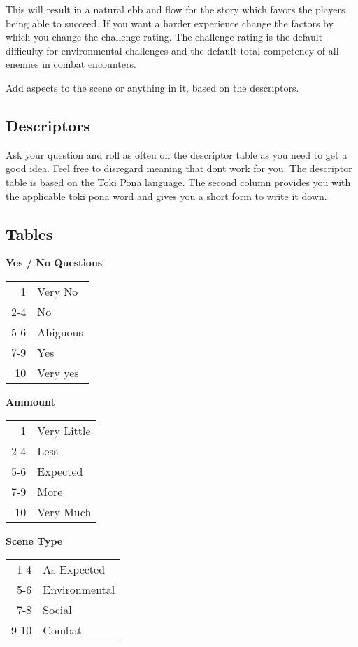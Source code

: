 \documentclass[11pt]{article}
\begin{document}
{This will result in a natural ebb and flow for the story which favors the players being able to succeed. If you want a harder experience change the factors by which you change the challenge rating. 
The challenge rating is the default difficulty for environmental challenges and the default total competency of all enemies in combat encounters.

Add aspects to the scene or anything in it, based on the descriptors.
\subsection{Descriptors}
\label{sec:org91d9afe}

Ask your question and roll as often on the descriptor table as you need to get a good idea. Feel free to disregard meaning that dont work for you.
The descriptor table is based on the Toki Pona language. The second column provides you with the applicable toki pona word and gives you a short form to write it down. 


\newpage
\subsection{Tables}
\label{sec:org507468c}
\begin{multicols}{3}[]
\begin{center}
\textbf{Yes / No Questions}
\begin{center}
\begin{tabular}{rl}
1 & Very No\\
2-4 & No\\
5-6 & Abiguous\\
7-9 & Yes\\
10 & Very yes\\
\end{tabular}
\end{center}
\columnbreak
\textbf{Ammount}
\begin{center}
\begin{tabular}{rl}
1 & Very Little\\
2-4 & Less\\
5-6 & Expected\\
7-9 & More\\
10 & Very Much\\
\end{tabular}
\end{center}
\columnbreak
\textbf{Scene Type}
\begin{center}
\begin{tabular}{rl}
1-4 & As Expected\\
5-6 & Environmental\\
7-8 & Social\\
9-10 & Combat\\
\end{tabular}
\end{center}
\end{center}
\end{multicols}


}
\end{document}

